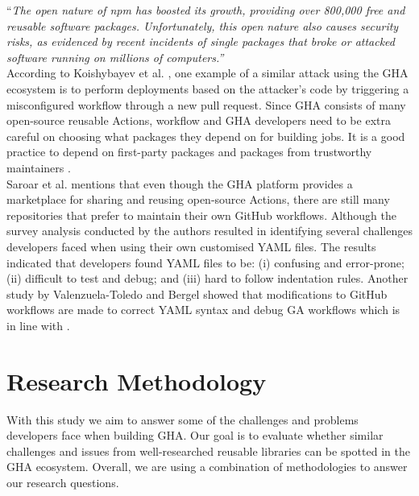 \documentclass[conference]{IEEEtran}
\begin{document}
        “\textit{The open nature of npm has boosted its growth, providing over 800,000 free and reusable software packages. Unfortunately, this open nature also causes security risks, as evidenced by recent incidents of single packages that broke or attacked software running on millions of computers.”} \\

        According to Koishybayev et al. \cite{koishybayev2022characterizing}, one example of a similar attack using the GHA ecosystem is to perform deployments based on the attacker’s code by triggering a misconfigured workflow through a new pull request. Since GHA consists of many open-source reusable Actions, workflow and GHA developers need to be extra careful on choosing what packages they depend on for building jobs. It is a good practice to depend on first-party packages and packages from trustworthy maintainers \cite{zimmermann2019small}. \\

        Saroar et al. \cite{saroar2023developers} mentions that even though the GHA platform provides a marketplace for sharing and reusing open-source Actions, there are still many repositories that prefer to maintain their own GitHub workflows. Although the survey analysis conducted by the authors resulted in identifying several challenges developers faced when using their own customised YAML files.  The results indicated that developers found YAML files to be: (i) confusing and error-prone; (ii) difficult to test and debug; and (iii) hard to follow indentation rules. Another study by Valenzuela-Toledo and Bergel \cite{valenzuela2022evolution}  showed that modifications to GitHub workflows are made to correct YAML syntax and debug GA workflows which is in line with \cite{saroar2023developers}.



\section{Research Methodology}
    With this study we aim to answer some of the challenges and problems developers face when building GHA. Our goal is to evaluate whether similar challenges and issues from well-researched reusable libraries can be spotted in the GHA ecosystem. Overall,  we are using a combination of methodologies to answer our research questions.\\
\end{document}
